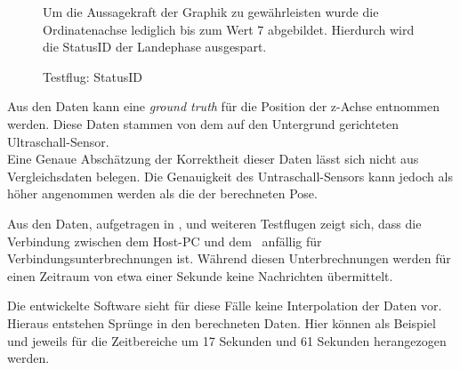 \begin{figure}[ht!]
\vspace{0.25cm}
\begin{center}
\caption{Testflug: StatusID}
\label{fig:FlightStatus}
\end{center}

\vspace{0.25cm}
Um die Aussagekraft der Graphik zu gewährleisten wurde die Ordinatenachse lediglich bis zum Wert 7 abgebildet. Hierdurch wird die StatusID der Landephase ausgespart.
\end{figure}

Aus den Daten kann eine \textit{ground truth} für die Position der z-Achse entnommen werden. Diese Daten stammen von dem auf den Untergrund gerichteten Ultraschall-Sensor.\\
Eine Genaue Abschätzung der Korrektheit dieser Daten lässt sich nicht aus Vergleichsdaten belegen. Die Genauigkeit des Untraschall-Sensors kann jedoch als höher angenommen werden als die der berechneten Pose.


\FloatBarrier
{}








Aus den Daten, aufgetragen in , und weiteren Testflugen zeigt sich, dass die Verbindung zwischen dem Host-PC und dem \Quad\ anfällig für Verbindungsunterbrechnungen ist. Während diesen Unterbrechnungen werden für einen Zeitraum von etwa einer Sekunde keine Nachrichten übermittelt. 

Die entwickelte Software sieht für diese Fälle keine Interpolation der Daten vor. Hieraus entstehen Sprünge in den berechneten Daten. Hier können als Beispiel  und  jeweils für die Zeitbereiche um 17 Sekunden und 61 Sekunden herangezogen werden.







